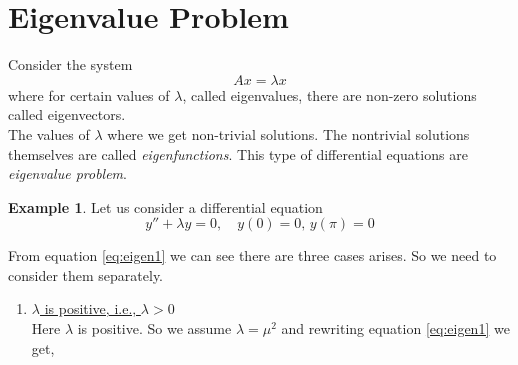 \documentclass[12pt,a4paper]{article}
\theoremstyle{remark}
\theoremstyle{definition}
\newtheorem{ex}{Example}[section]
\begin{document}
\section{Eigenvalue Problem}
Consider the system
\[
    Ax=\lambda x
\]
where for certain values of $ \lambda $, called eigenvalues, there are non-zero solutions called eigenvectors.\\
The values of $ \lambda $ where we get non-trivial solutions. The nontrivial solutions themselves are called \emph{eigenfunctions}. This type of differential equations are \emph{eigenvalue problem}.
\begin{ex}
    Let us consider a differential equation
    \begin{equation}
        \label{eq:eigen1}
        y''+\lambda y=0,\quad y(0)=0,\,y(\pi)=0
    \end{equation}


    From equation \eqref{eq:eigen1} we can see there are three cases arises. So we need to consider them separately.
    \begin{enumerate}[label={Case \arabic*:}]
        \item \underline{$ \lambda $ is positive, i.e., $ \lambda >0 $}\\
              Here $ \lambda $ is positive. So we assume $ \lambda=\mu^2 $ and rewriting equation \eqref{eq:eigen1} we get,


\end{enumerate}
\end{ex}
\end{document}

